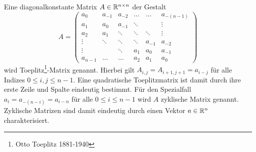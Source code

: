 \begin{defi}
    \label{def:toeplitzM}
    Eine diagonalkonstante Matrix $A \in \mathbb{R}^{n \times n}$ der Gestalt
    \begin{equation*}
    A=
    \begin{pmatrix}
        a_0 & a_{-1} &a_{-2} &\ldots &\ldots &a_{-(n-1)} \\ 
        a_1 & a_0 &a_{-1} &\ddots & &\vdots \\
        a_2 & a_1 &\ddots &\ddots &\ddots &\vdots\\
        \vdots & \ddots &\ddots &\ddots &a_{-1} &a_{-2}\\
        \vdots & &\ddots &a_1 &a_0 &a_{-1} \\
        a_{n-1} &\ldots &\ldots &a_{2} &a_{1} &a_0
    \end{pmatrix}
\end{equation*}
    wird Toeplitz\footnote{Otto Toeplitz 1881-1940}-Matrix genannt. Hierbei gilt $A_{i,j}=A_{i+1,j+1}=a_{i-j}$ für alle Indizes $0 \leq i, j \leq n-1$. Eine quadratische Toeplitzmatrix ist damit durch ihre erste Zeile und Spalte eindeutig bestimmt. Für den Spezialfall $a_i=a_{-(n-i)}=a_{i-n}$ für alle $0 \leq i \leq n-1$ wird $A$ zyklische Matrix genannt. Zyklische Matrizen sind damit eindeutig durch einen Vektor $a \in \mathbb{R}^n$ charakterisiert.
\end{defi}

    
